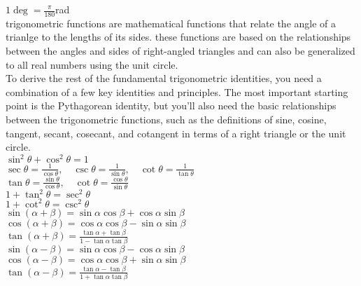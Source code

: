 \documentclass{article}
\begin{document}
$1 \deg = \frac{\pi}{180}$rad\\

trigonometric functions are mathematical functions that relate the angle of a trianlge to the lengths of its sides. these functions are based on the relationships between the angles and sides of right-angled triangles and can also be generalized to all real numbers using the unit circle.\\

To derive the rest of the fundamental trigonometric identities, you need a combination of a few key identities and principles. The most important starting point is the Pythagorean identity, but you’ll also need the basic relationships between the trigonometric functions, such as the definitions of sine, cosine, tangent, secant, cosecant, and cotangent in terms of a right triangle or the unit circle. \\

$ \sin^2 \theta + \cos^2 \theta = 1 $\\

$ \sec \theta = \frac{1}{\cos \theta}, \quad \csc \theta = \frac{1}{\sin \theta}, \quad \cot \theta = \frac{1}{\tan \theta} $\\

$ \tan \theta = \frac{\sin \theta}{\cos \theta}, \quad \cot \theta = \frac{\cos \theta}{\sin \theta} $\\

$ 1 + \tan^2 \theta = \sec^2 \theta $\\

$ 1 + \cot^2 \theta = \csc^2 \theta $\\

$ \sin(\alpha + \beta) = \sin \alpha \cos \beta + \cos \alpha \sin \beta $\\

$ \cos(\alpha + \beta) = \cos \alpha \cos \beta - \sin \alpha \sin \beta $\\

$ \tan(\alpha + \beta) = \frac{\tan \alpha + \tan \beta}{1 - \tan \alpha \tan \beta} $\\

$ \sin(\alpha - \beta) = \sin \alpha \cos \beta - \cos \alpha \sin \beta $\\

$ \cos(\alpha - \beta) = \cos \alpha \cos \beta + \sin \alpha \sin \beta $\\

$ \tan(\alpha - \beta) = \frac{\tan \alpha - \tan \beta}{1 + \tan \alpha \tan \beta} $\\
\end{document}
